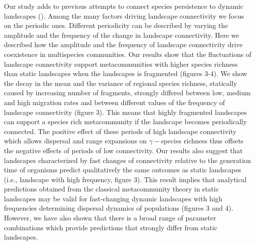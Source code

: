 \documentclass[12pt]{article}
\begin{document}
    Our study adds to previous attempts to connect species persistence to dynamic landscapes (\cite{Hanski1999, keymeretal2000}). Among the many factors driving landscape connectivity we focus on the periodic ones. Different periodicity can be described by varying the amplitude and the frequency of the change in landscape connectivity. Here we described how the amplitude and the frequency of landscape connectivity drive coexistence in multispecies communities. Our results show that the fluctuations of landscape connectivity support metacommunities with higher species richness than static landscapes when the landscapes is fragmented  (figures 3-4). We show the decay in the mean and the variance of regional species richness, statically caused by increasing number of fragments, strongly differed between low, medium and high migration rates and between different values of the frequency of landscape connectivity (figure 3). This means that highly fragmented landscapes can support a species rich metacommunity if the landscape becomes periodically connected. The positive effect of these periods of high landscape connectivity which allows dispersal and range expansions on $\gamma-$species richness thus offsets the negative effects of periods of low connectivity. Our results also suggest that landscapes characterized by fast changes of connectivity relative to the generation time of organisms predict qualitatively the same outcomes as static landscapes (i.e., landscape with high frequency, figure 3). This result implies that analytical predictions obtained from the classical metacommunity theory in static landscapes may be valid for fast-changing dynamic landscapes with high frequencies determining dispersal dynamics of populations (figures 3 and 4). However, we have also shown that there is a broad range of parameter combinations which provide predictions that strongly differ from static landscapes.
    
\end{document}
